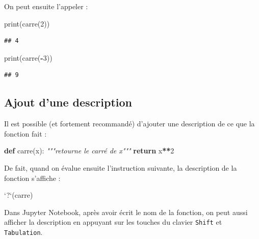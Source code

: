 \documentclass[12pt,]{book}
\newenvironment{Shaded}{\begin{snugshade}}{\end{snugshade}}
\newcommand{\KeywordTok}[1]{\textcolor[rgb]{0.13,0.29,0.53}{\textbf{#1}}}
\newcommand{\DataTypeTok}[1]{\textcolor[rgb]{0.13,0.29,0.53}{#1}}
\newcommand{\DecValTok}[1]{\textcolor[rgb]{0.00,0.00,0.81}{#1}}
\newcommand{\StringTok}[1]{\textcolor[rgb]{0.31,0.60,0.02}{#1}}
\newcommand{\CommentTok}[1]{\textcolor[rgb]{0.56,0.35,0.01}{\textit{#1}}}
\newcommand{\ControlFlowTok}[1]{\textcolor[rgb]{0.13,0.29,0.53}{\textbf{#1}}}
\newcommand{\OperatorTok}[1]{\textcolor[rgb]{0.81,0.36,0.00}{\textbf{#1}}}
\newcommand{\BuiltInTok}[1]{#1}
\newcommand{\NormalTok}[1]{#1}
\numberwithin{equation}{section}
\numberwithin{countremarque}{section}
\begin{document}
On peut ensuite l'appeler :

\begin{Shaded}
\begin{Highlighting}[]
\BuiltInTok{print}\NormalTok{(carre(}\DecValTok{2}\NormalTok{))}
\end{Highlighting}
\end{Shaded}

\begin{lstlisting}
## 4
\end{lstlisting}

\begin{Shaded}
\begin{Highlighting}[]
\BuiltInTok{print}\NormalTok{(carre(}\OperatorTok{-}\DecValTok{3}\NormalTok{))}
\end{Highlighting}
\end{Shaded}

\begin{lstlisting}
## 9
\end{lstlisting}

\subsection{Ajout d'une description}\label{ajout-dune-description}

Il est possible (et fortement recommandé) d'ajouter une description de
ce que la fonction fait :

\begin{Shaded}
\begin{Highlighting}[]
\KeywordTok{def}\NormalTok{ carre(x):}
  \CommentTok{"""retourne le carré de x"""}
  \ControlFlowTok{return}\NormalTok{ x}\OperatorTok{**}\DecValTok{2}
\end{Highlighting}
\end{Shaded}

De fait, quand on évalue ensuite l'instruction suivante, la description
de la fonction s'affiche :

\begin{Shaded}
\begin{Highlighting}[]
\StringTok{`}\DataTypeTok{?}\StringTok{`}\NormalTok{(carre)}
\end{Highlighting}
\end{Shaded}

Dans Jupyter Notebook, après avoir écrit le nom de la fonction, on peut
aussi afficher la description en appuyant sur les touches du clavier
\texttt{Shift} et \texttt{Tabulation}.
\end{document}
